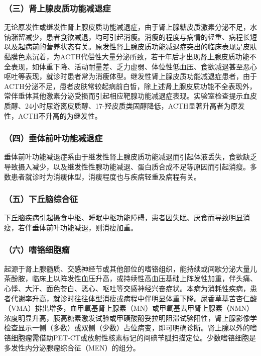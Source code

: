 \subsubsection{（三）肾上腺皮质功能减退症}

无论原发性或继发性肾上腺皮质功能减退症，由于肾上腺糖皮质激素分泌不足，水钠潴留减少，患者食欲减退，均可引起消瘦。消瘦的程度与病情的轻重、病程长短以及起病前的营养状态有关。原发性肾上腺皮质功能减退症突出的临床表现是皮肤黏膜色素沉着，为ACTH代偿性大量分泌所致，若干年后才出现肾上腺皮质功能不全表现，如体重下降、活动耐量差、乏力虚弱、体位性低血压、食欲减退甚至恶心呕吐等表现，就诊时患者常为消瘦体型。继发性肾上腺皮质功能减退症患者，由于ACTH分泌不足，患者皮肤常较起病前白皙，除上述肾上腺皮质功能不全表现外，常伴垂体其他激素分泌受损而引起相应靶腺功能减退症表现。实验室检查提示血皮质醇、24小时尿游离皮质醇、17-羟皮质类固醇降低，ACTH显著升高者为原发性，ACTH不升高的为继发性。

\subsubsection{（四）垂体前叶功能减退症}

垂体前叶功能减退症系由于继发性肾上腺皮质功能减退而引起体液丢失，食欲缺乏导致摄入减少，以及继发性性腺功能减退、蛋白质合成不足等原因而引起消瘦。多数患者就诊时为消瘦体型，消瘦程度也与疾病轻重及病程有关。

\subsubsection{（五）下丘脑综合征}

下丘脑疾病引起摄食中枢、睡眠中枢功能障碍，患者因失眠、厌食而导致明显消瘦，若伴垂体前叶功能减退，则消瘦加重。

\subsubsection{（六）嗜铬细胞瘤}

起源于肾上腺髓质、交感神经节或其他部位的嗜铬组织，能持续或间歇分泌大量儿茶酚胺，临床上以阵发性血压升高，或持续性高血压基础上阵发性加重，伴头痛、心悸、大汗、面色苍白、恶心、呕吐等交感神经兴奋症状。本病为消耗性疾病，患者代谢率升高，就诊时往往体型消瘦或病程中伴明显体重下降。尿香草基苦杏仁酸（VMA）排出增多，血甲氧基肾上腺素（MN）或甲氧基去甲肾上腺素（NMN）浓度明显升高，胰高糖素激发试验或甲磺酸酚妥拉明阻滞试验阳性，肾上腺影像学检查显示一侧（多数）或双侧（少数）占位病变，即可明确诊断。肾上腺以外的嗜铬细胞瘤需借助PET-CT或放射性核素标记的间碘苄胍扫描定位。少数嗜铬细胞是多发性内分泌腺瘤综合征（MEN）的组分。

